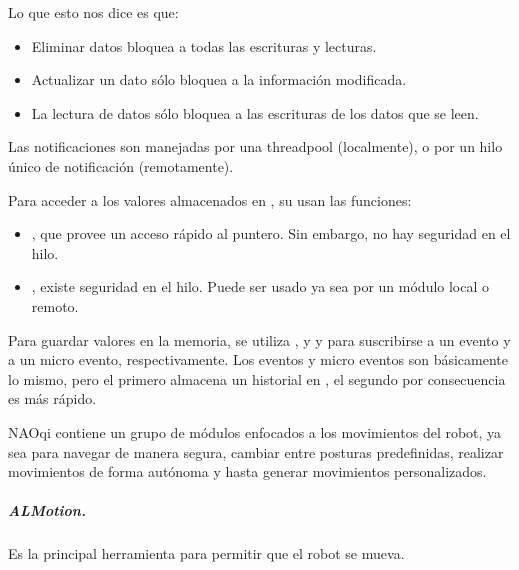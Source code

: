 Lo que esto nos dice es que:
\begin{itemize}
\item {} 
Eliminar datos bloquea a todas las escrituras y lecturas.

\item {} 
Actualizar un dato sólo bloquea a la información modificada.

\item {} 
La lectura de datos sólo bloquea a las escrituras de los datos que se leen.

\end{itemize}

Las notificaciones son manejadas por una threadpool (localmente), o por un
hilo único de notificación (remotamente).


Para acceder a los valores almacenados en , su usan las funciones:
\begin{itemize}
\item {} 
, que provee un acceso rápido al puntero. Sin embargo, no hay seguridad en el hilo.

\item {} 
, existe seguridad en el hilo. Puede ser usado ya sea por un módulo local o remoto.

\end{itemize}

Para guardar valores en la memoria, se utiliza , y
 y 
para suscribirse a un evento y a un micro evento, respectivamente. Los eventos
y micro eventos son básicamente lo mismo, pero el primero almacena un historial
en , el segundo por consecuencia es más rápido.

NAOqi contiene un grupo de módulos enfocados a los movimientos del robot,
ya sea para navegar de manera segura, cambiar entre posturas predefinidas,
realizar movimientos de forma autónoma y hasta generar movimientos
personalizados.


\subparagraph{ALMotion.}
\label{\detokenize{chapter_one/naoqi:almotion}}
Es la principal herramienta para permitir que el robot se mueva.

